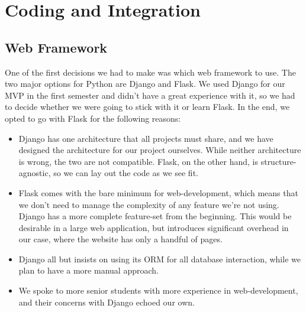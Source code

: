 \documentclass[main.tex]{subfiles}
\begin{document}
\section{Coding and Integration}
\subsection{Web Framework}
One of the first decisions we had to make was which web framework to use. The two major options for Python are Django and Flask. We used Django for our MVP in the first semester and didn't have a great experience with it, so we had to decide whether we were going to stick with it or learn Flask. In the end, we opted to go with Flask for the following reasons:

\begin{itemize}
    \item Django has one architecture that all projects must share, and we have designed the architecture for our project ourselves. While neither architecture is wrong, the two are not compatible. Flask, on the other hand, is structure-agnostic, so we can lay out the code as we see fit.

\item Flask comes with the bare minimum for web-development, which means that we don't need to manage the complexity of any feature we're not using. Django has a more complete feature-set from the beginning. This would be desirable in a large web application, but introduces significant overhead in our case, where the website has only a handful of pages.

\item Django all but insists on using its ORM for all database interaction, while we plan to have a more manual approach.

\item We spoke to more senior students with more experience in web-development, and their concerns with Django echoed our own.

\end{itemize}

\iffalse
Sources:
https://www.djangoproject.com/

https://flask.palletsprojects.com/en/1.1.x/

https://www.codementor.io/@garethdwyer/flask-vs-django-why-flask-might-be-better-4xs7mdf8v

http://ddi-dev.com/blog/programming/django-vs-flask-which-better-your-web-app/

https://coderseye.com/django-vs-flask
\fi
\end{document}
